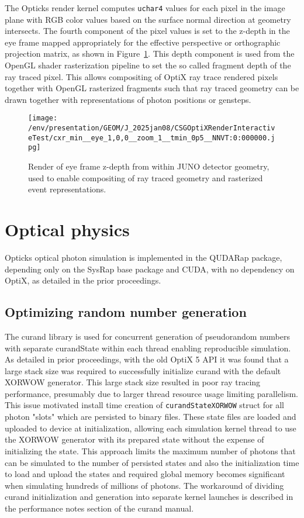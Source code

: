 \documentclass{webofc}
\begin{document}
The Opticks render kernel computes {\tt uchar4} values for each pixel in the image 
plane with RGB color values based on the surface normal direction at geometry intersects. 
The fourth component of the pixel values is set to the z-depth in the eye frame 
mapped appropriately for the effective perspective or orthographic projection matrix, 
as shown in Figure~\ref{depth}.  
This depth component is used from the OpenGL shader rasterization pipeline to set the 
so called fragment depth of the ray traced pixel. This allows compositing of OptiX ray 
trace rendered pixels together with OpenGL rasterized fragments such that 
ray traced geometry can be drawn together with representations of photon positions or gensteps.
%
%
\begin{figure}
\centering
\texttt{[image: /env/presentation/GEOM/J\_2025jan08/CSGOptiXRenderInteractiveTest/cxr\_min\_\_eye\_1,0,0\_\_zoom\_1\_\_tmin\_0p5\_\_NNVT:0:000000.jpg]}
\caption{Render of eye frame z-depth from within JUNO detector geometry, used to enable compositing of ray traced geometry and rasterized event representations.}  
\label{depth}
\vspace{-5mm}
\end{figure}%
%
% 
\section{Optical physics}%
%
Opticks optical photon simulation is implemented in the QUDARap package, 
depending only on the SysRap base package and CUDA, with no dependency on OptiX,
as detailed in the prior proceedings\cite{chep2023}.
%
\subsection{Optimizing random number generation}
\label{optrng} 
%
The curand library\cite{curand} is used for concurrent generation 
of pseudorandom numbers with separate curandState within each thread
enabling reproducible simulation.
As detailed in prior proceedings\cite{chep2016}, with the old OptiX 5 API
it was found that a large stack size was required to successfully initialize curand
with the default XORWOW generator. This large stack size resulted in poor ray tracing 
performance, presumably due to larger thread resource usage limiting parallelism.  
This issue motivated install time creation of {\tt curandStateXORWOW} struct 
for all photon "slots" which are persisted to binary files.  
These state files are loaded and uploaded to device at initialization,  
allowing each simulation kernel thread to use the XORWOW generator with its 
prepared state without the expense of initializing the state. 
This approach limits the maximum number of photons 
that can be simulated to the number of persisted states and also the initialization time 
to load and upload the states and required global memory becomes significant when simulating 
hundreds of millions of photons. 
The workaround of dividing curand initialization and generation into 
separate kernel launches is described in the performance notes 
section of the curand manual\cite{curand}. 
\end{document}
